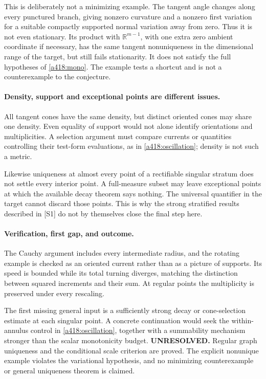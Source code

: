\documentclass[11pt]{article}
\begin{document}
This is deliberately not a minimizing example.
The tangent angle changes along every punctured
branch, giving nonzero curvature and a nonzero
first variation for a suitable compactly supported
normal variation away from zero. Thus it is not
even stationary. Its product with $\mathbb R^{m-1}$,
with one extra zero ambient coordinate if necessary,
has the same tangent nonuniqueness in the dimensional
range of the target, but still fails stationarity.
It does not satisfy the full hypotheses of
\eqref{a418:mono}. The example tests a shortcut
and is not a counterexample to the conjecture.

\paragraph{Density, support and exceptional points are different issues.}
All tangent cones have the same density, but distinct
oriented cones may share one density. Even equality
of support would not alone identify orientations
and multiplicities. A selection argument must
compare currents or quantities controlling their
test-form evaluations, as in
\eqref{a418:oscillation}; density is not such a metric.

Likewise uniqueness at almost every point of a
rectifiable singular stratum does not settle
every interior point. A full-measure subset
may leave exceptional points at which the
available decay theorem says nothing. The
universal quantifier in the target cannot
discard those points. This is why the strong
stratified results described in [S1] do not
by themselves close the final step here.

\paragraph{Verification, first gap, and outcome.}
The Cauchy argument includes every intermediate radius,
and the rotating example is checked as an oriented
current rather than as a picture of supports.
Its speed is bounded while its total turning
diverges, matching the distinction between
squared increments and their sum. At regular
points the multiplicity is preserved under
every rescaling.

The first missing general input is a sufficiently
strong decay or cone-selection estimate at each
singular point. A concrete continuation would
seek the within-annulus control in
\eqref{a418:oscillation}, together with a
summability mechanism stronger than the scalar
monotonicity budget.
\textbf{UNRESOLVED.} Regular graph uniqueness
and the conditional scale criterion are
proved. The explicit nonunique example
violates the variational hypothesis, and
no minimizing counterexample or general
uniqueness theorem is claimed.
\end{document}
